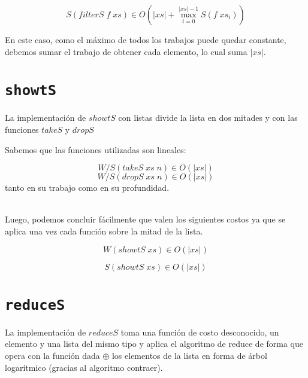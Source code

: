\documentclass[a4paper,10pt]{article}
\begin{document}
\begin{equation*}
    S \left(filterS\; f \; xs \right) \in
    O \left( \vert xs \vert + \max_{i=0}^{\vert xs \vert -1} S \left( f\; xs_i \right) \right)
\end{equation*}

En este caso, como el máximo de todos los trabajos puede quedar constante, debemos
sumar el trabajo de obtener cada elemento, lo cual suma $\vert xs \vert$.


\bigskip

 
\section*{\texttt{showtS}}

    La implementación de $showtS$ con listas divide la lista en dos mitades
y con las funciones $takeS$ y $dropS$

    Sabemos que las funciones utilizadas son lineales:

\begin{equation*}
    W/S \left( takeS\; xs\; n \right) \in 
    O \left( \vert xs \vert \right)
\end{equation*}
\begin{equation*}
    W/S \left( dropS\; xs\; n \right) \in 
    O \left( \vert xs \vert \right)
\end{equation*}
tanto en su trabajo como en su profundidad. 

\bigskip
\\   
    Luego, podemos concluir fácilmente que valen los siguientes costos ya
que se aplica una vez cada función sobre la mitad de la lista.

\begin{equation*}
    W \left( showtS\; xs \right) \in O \left( \vert xs \vert \right)
\end{equation*}

\begin{equation*}
    S \left( showtS\; xs \right) \in O \left( \vert xs \vert \right)
\end{equation*}


\bigskip
    

\section*{\texttt{reduceS}}

    La implementación de $reduceS$ toma una función de costo desconocido,
un elemento y una lista del mismo tipo y aplica el algoritmo de reduce
de forma que opera con la función dada $\oplus$ los elementos de la lista
en forma de árbol logarítmico (gracias al algoritmo contraer).
\end{document}
